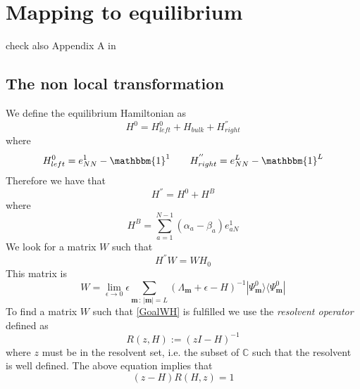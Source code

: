 \documentclass[10pt]{article}
\numberwithin{equation}{section}
\numberwithin{equation}{subsection}
\begin{document}
\section{Mapping to equilibrium}
check also Appendix A in
\cite{Alcaraz:1992zc} \cite{Sklyanin:1988yz} 
\subsection{The non local transformation}\label{SectionNonLocalTrasformation}
We define the equilibrium Hamiltonian as
\begin{equation}
	H^{0}=H_{left}^{0}+H_{bulk}+H^{''}_{right}
\end{equation}
where
\begin{equation}
	H_{left}^{0}=e_{NN}^{1}-\mathbbm{1}^{1}\qquad H_{right}^{''}=e_{NN}^{L}-\mathbbm{1}^{L}
\end{equation}
Therefore we have that
\begin{equation}
	H^{''}=H^{0}+H^{B}
\end{equation}
where
\begin{equation}
	H^{B}=\sum_{a=1}^{N-1}(\alpha_{a}-\beta_{a})e_{aN}^{1}
\end{equation}
We look for a matrix $W$ such that 
\begin{equation}\label{GoalWH}
	H^{''}W=WH_{0}
\end{equation}
This matrix is 
\begin{equation}\label{W-extended}
	W= \lim_{\epsilon\to 0}\epsilon\sum_{\bm{m}\,:\,|\bm{m}|=L}  \left(\Lambda_{\bm{m}}+\epsilon-H\right)^{-1}|\Psi_{\bm{m}}^{0}\rangle \langle \Psi_{\bm{m}}^{0}|
\end{equation}
To find a matrix $W$ such that \eqref{GoalWH} is fulfilled we use the \textit{resolvent operator} defined as
\begin{equation}
	R(z,H):=\left(zI-H\right)^{-1}
\end{equation}
where $z$ must be in the resolvent set, i.e. the subset of $\mathbb{C}$ such that the resolvent is well defined. 
The above equation implies that 
\begin{equation}
	(z-H)R(H,z)=1
\end{equation}
\end{document}
